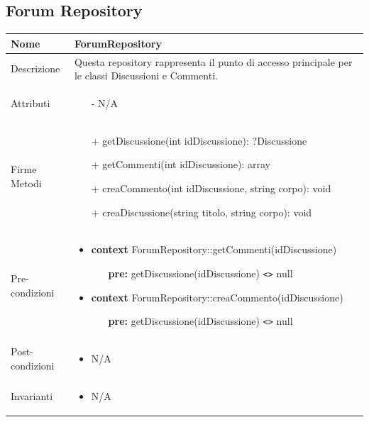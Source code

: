 \newpage
\subsection{Forum Repository}
\small\begin{tabular}{|| l | p{34em} ||} 
	\hline
	Nome & ForumRepository\\
	\hline
	Descrizione & Questa repository rappresenta il punto di accesso principale per le classi Discussioni e Commenti.\\
	\hline
	Attributi & \begin{itemize}
		\item[-] N/A
	\end{itemize}\\
	\hline
	Firme Metodi & \begin{itemize}
		\item[+] getDiscussione(int idDiscussione): ?Discussione
		\item[+] getCommenti(int idDiscussione): array 
		\item[+] creaCommento(int idDiscussione, string corpo): void
		\item[+] creaDiscussione(string titolo, string corpo): void
	\end{itemize}\\
	\hline
Pre-condizioni & \begin{itemize}[leftmargin=*]
	\item \textbf{context} ForumRepository::getCommenti(idDiscussione)
	\begin{itemize}
		\item[ ] \textbf{pre:} getDiscussione(idDiscussione) \verb|<>| null
	\end{itemize}

	\item \textbf{context} ForumRepository::creaCommento(idDiscussione)
	\begin{itemize}
		\item[ ] \textbf{pre:} getDiscussione(idDiscussione) \verb|<>| null
	\end{itemize}
\end{itemize}\\
\hline
Post-condizioni & \begin{itemize}[leftmargin=*]
	\item N/A
\end{itemize}\\
\hline
Invarianti & \begin{itemize}
	\item N/A
\end{itemize}\\
\hline
\end{tabular}

